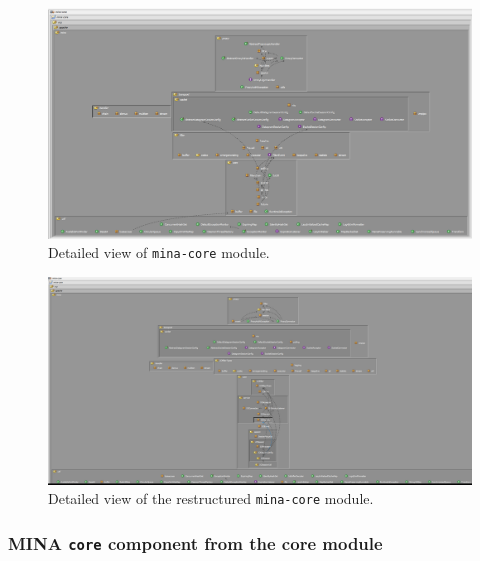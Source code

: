 \begin{landscape}
\begin{figure}
    \centering
    \includegraphics[scale=0.6]{images/MINA_core_extended_initial.png}
    \caption{Detailed view of \texttt{mina-core} module.}
    \label{fig:mina_core_initial_detailed}
\end{figure}
\end{landscape}

\begin{landscape}
\begin{figure}
    \centering
    \includegraphics[scale=0.4]{images/MINA_core_extended_restructured.png}
    \caption{Detailed view of the restructured \texttt{mina-core} module.}
    \label{fig:mina_core_initial_detailed}
\end{figure}
\end{landscape}

\subsubsection{MINA \texttt{core} component from the core module}

